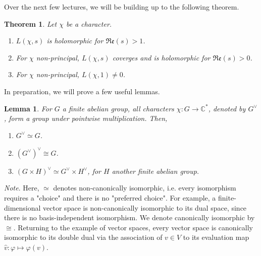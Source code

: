 \documentclass[12pt]{article}
\newcommand{\complex}{\mathbb{C}}
\newtheorem{thm}{Theorem}
\newtheorem{lemma}{Lemma}
\numberwithin{equation}{section}
\numberwithin{thm}{section}
\numberwithin{lemma}{section}
\numberwithin{cor}{section}
\begin{document}
Over the next few lectures, we will be building up to the following theorem.

\begin{thm}\label{LFunctionTheorem1} Let $\chi$ be a character.
  \begin{enumerate}
    \item $L(\chi, s)$ is holomorphic for $\mathfrak{Re}(s) > 1$.
    \item For $\chi$ non-principal, $L(\chi, s)$ coverges and is holomorphic for $\mathfrak{Re}(s) > 0$.
    \item For $\chi$ non-principal, $L(\chi, 1) \ne 0$.
  \end{enumerate}
\end{thm}

In preparation, we will prove a few useful lemmas. 

\begin{lemma}\label{DualIsomorphismTheorem}
  For $G$ a finite abelian group, all characters $\chi: G \to \complex^*$, denoted by $G^{\vee}$, form a group under pointwise multiplication. Then,
  \begin{enumerate}
    \item $G^{\vee} \simeq G$.
    \item $(G^{\vee})^{\vee} \cong G$.
    \item $(G \times H)^{\vee} \simeq G^{\vee} \times H^{\vee}$, for $H$ another finite abelian group.
  \end{enumerate}
\end{lemma}

\textit{Note}. Here, $\simeq$ denotes non-canonically isomorphic, i.e. every isomorphism requires a "choice" and there is no "preferred choice". For example, a finite-dimensional vector space is non-canonically isomorphic to its dual space, since there is no basis-independent isomorphism. We denote canonically isomorphic by $\cong$. Returning to the example of vector spaces, every vector space is canonically isomorphic to its double dual via the association of $v \in V$ to its evaluation map $\widehat{v}: \varphi \mapsto \varphi(v)$.
\end{document}

